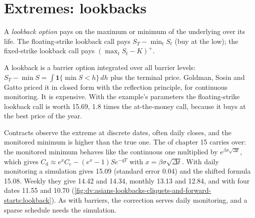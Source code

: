 \section{Extremes: lookbacks}

\begin{definition}\label{def:dv:asians-lookbacks-cliquets-and-forward-starts:lookback}
A \emph{lookback option} pays on the maximum or minimum of the underlying over its life. The
floating-strike lookback call pays $S_T-\min_tS_t$ (buy at the low); the fixed-strike lookback call pays
$(\max_tS_t-K)^+$.
\end{definition}

A lookback is a barrier option integrated over all barrier levels: $S_T-\min S=\int\mathbf 1\{\min S<h\}\,dh$ plus
the terminal price. Goldman, Sosin and Gatto priced it in closed form with the reflection principle, for continuous
monitoring. It is expensive. With the example's parameters the floating-strike lookback call is worth 15.69, 1.8 times the
at-the-money call, because it buys at the best price of the year.

Contracts observe the extreme at discrete dates, often daily closes, and the monitored minimum is higher than the true
one. The  of chapter 15 carries over: the monitored minimum behaves like the continuous one multiplied by
$e^{\beta\sigma\sqrt{\Delta t}}$, which gives $C_{\mathrm d}\approx e^{x}C_{\mathrm c}-(e^x-1)Se^{-qT}$ with
$x=\beta\sigma\sqrt{\Delta t}$. With daily monitoring a simulation gives 15.09 (standard error 0.04) and the shifted formula
15.08. Weekly they give 14.42 and 14.34, monthly 13.13 and 12.84, and with four dates 11.55 and 10.70
(\cref{fig:dv:asians-lookbacks-cliquets-and-forward-starts:lookback}). As with barriers, the correction serves daily
monitoring, and a sparse schedule needs the simulation.

